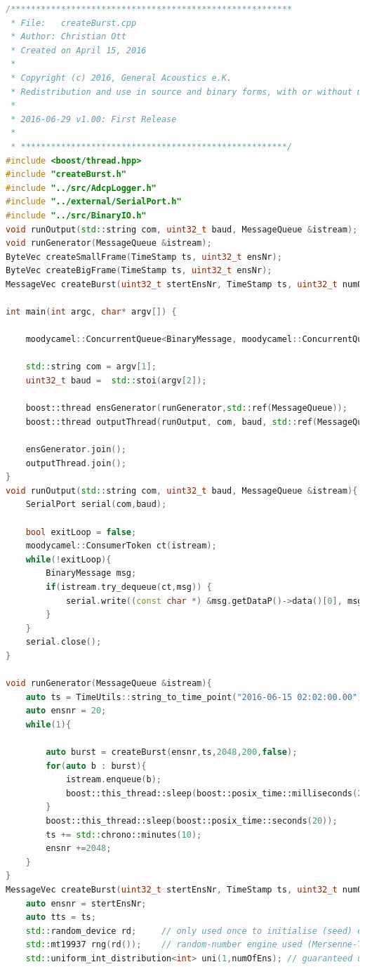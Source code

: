 \begin{lstlisting}[language=C++]
/********************************************************
 * File:   createBurst.cpp
 * Author: Christian Ott
 * Created on April 15, 2016
 *
 * Copyright (c) 2016, General Acoustics e.K.
 * Redistribution and use in source and binary forms, with or without modification, are permitted!
 *
 * 2016-06-29 v1.00: First Release
 *
 * *****************************************************/
#include <boost/thread.hpp>
#include "createBurst.h"
#include "../src/AdcpLogger.h"
#include "../external/SerialPort.h"
#include "../src/BinaryIO.h"
void runOutput(std::string com, uint32_t baud, MessageQueue &istream);
void runGenerator(MessageQueue &istream);
ByteVec createSmallFrame(TimeStamp ts, uint32_t ensNr);
ByteVec createBigFrame(TimeStamp ts, uint32_t ensNr);
MessageVec createBurst(uint32_t stertEnsNr, TimeStamp ts, uint32_t numOfEns, uint32_t delta, bool err );

int main(int argc, char* argv[]) {

    moodycamel::ConcurrentQueue<BinaryMessage, moodycamel::ConcurrentQueueDefaultTraits> MessageQueue(200);

    std::string com = argv[1];
    uint32_t baud =  std::stoi(argv[2]);

    boost::thread ensGenerator(runGenerator,std::ref(MessageQueue));
    boost::thread outputThread(runOutput, com, baud, std::ref(MessageQueue));

    ensGenerator.join();
    outputThread.join();
}
void runOutput(std::string com, uint32_t baud, MessageQueue &istream){
    SerialPort serial(com,baud);

    bool exitLoop = false;
    moodycamel::ConsumerToken ct(istream);
    while(!exitLoop){
        BinaryMessage msg;
        if(istream.try_dequeue(ct,msg)) {
            serial.write((const char *) &msg.getDataP()->data()[0], msg.getDataP()->size());
        }
    }
    serial.close();
}

void runGenerator(MessageQueue &istream){
    auto ts = TimeUtils::string_to_time_point("2016-06-15 02:02:00.00");
    auto ensnr = 20;
    while(1){

        auto burst = createBurst(ensnr,ts,2048,200,false);
        for(auto b : burst){
            istream.enqueue(b);
            boost::this_thread::sleep(boost::posix_time::milliseconds(2));
        }
        boost::this_thread::sleep(boost::posix_time::seconds(20));
        ts += std::chrono::minutes(10);
        ensnr +=2048;
    }
}
MessageVec createBurst(uint32_t stertEnsNr, TimeStamp ts, uint32_t numOfEns, uint32_t delta, bool err ){
    auto ensnr = stertEnsNr;
    auto tts = ts;
    std::random_device rd;     // only used once to initialise (seed) engine
    std::mt19937 rng(rd());    // random-number engine used (Mersenne-Twister in this case)
    std::uniform_int_distribution<int> uni(1,numOfEns); // guaranteed unbiased


\end{lstlisting}
